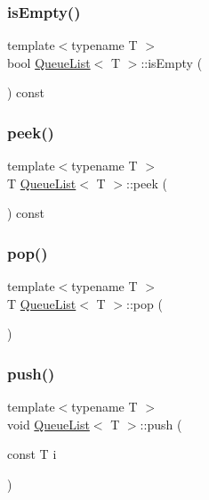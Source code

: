 \mbox{\label{class_queue_list_a827e0fc95c2dfcf5fe5313b25afef3e5}} 
\subsubsection{\texorpdfstring{is\+Empty()}{isEmpty()}}
{\footnotesize\ttfamily template$<$typename T $>$ \\
bool \mbox{\hyperlink{class_queue_list}{Queue\+List}}$<$ T $>$\+::is\+Empty (\begin{DoxyParamCaption}{ }\end{DoxyParamCaption}) const}

\mbox{\label{class_queue_list_aef76da8fe3b8bef765ccdddb18f998b3}} 
\subsubsection{\texorpdfstring{peek()}{peek()}}
{\footnotesize\ttfamily template$<$typename T $>$ \\
T \mbox{\hyperlink{class_queue_list}{Queue\+List}}$<$ T $>$\+::peek (\begin{DoxyParamCaption}{ }\end{DoxyParamCaption}) const}

\mbox{\label{class_queue_list_abf5fba15da77e79d28cb3f593f5fd0a7}} 
\subsubsection{\texorpdfstring{pop()}{pop()}}
{\footnotesize\ttfamily template$<$typename T $>$ \\
T \mbox{\hyperlink{class_queue_list}{Queue\+List}}$<$ T $>$\+::pop (\begin{DoxyParamCaption}{ }\end{DoxyParamCaption})}

\mbox{\label{class_queue_list_a47c26444335b418138450ba8bfb5ba13}} 
\subsubsection{\texorpdfstring{push()}{push()}}
{\footnotesize\ttfamily template$<$typename T $>$ \\
void \mbox{\hyperlink{class_queue_list}{Queue\+List}}$<$ T $>$\+::push (\begin{DoxyParamCaption}\item[{const T}]{i }\end{DoxyParamCaption})}

